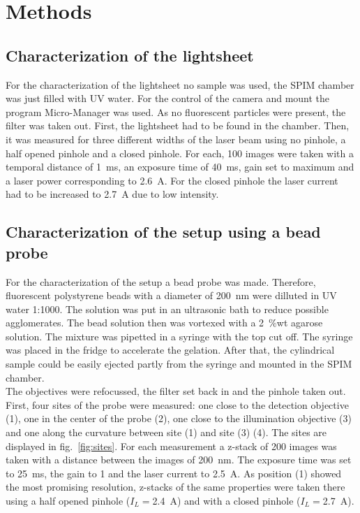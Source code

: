 \section{Methods}\label{sec:methods}
\subsection*{Characterization of the lightsheet}

For the characterization of the lightsheet no sample was used, the SPIM chamber was just filled with UV water. For the control of the camera and mount the program Micro-Manager was used. As no fluorescent particles were present, the filter was taken out. First, the lightsheet had to be found in the chamber. Then, it was measured for three different widths of the laser beam using no pinhole, a half opened pinhole and a closed pinhole. For each, 100 images were taken with a temporal distance of \SI{1}{\milli\second}, an exposure time of \SI{40}{\milli\second}, gain set to maximum and a laser power corresponding to \SI{2.6}{\ampere}. For the closed pinhole the laser current had to be increased to \SI{2.7}{\ampere} due to low intensity. 

\subsection*{Characterization of the setup using a bead probe}
For the characterization of the setup a bead probe was made. Therefore, fluorescent polystyrene beads with a diameter of \SI{200}{\nano\meter} were dilluted in UV water 1:1000. The solution was put in an ultrasonic bath to reduce possible agglomerates. The bead solution then was vortexed with a \SI{2}{\percent}wt agarose solution. The mixture was pipetted in a syringe with the top cut off. The syringe was placed in the fridge to accelerate the gelation. After that, the cylindrical sample could be easily ejected partly from the syringe and mounted in the SPIM chamber.\\
The objectives were refocussed, the filter set back in and the pinhole taken out. First, four sites of the probe were measured: one close to the detection objective (1), one in the center of the probe (2), one close to the illumination objective (3) and one along the curvature between site (1) and site (3) (4). The sites are displayed in fig.~\ref{fig:sites}. For each measurement a z-stack of 200 images was taken with a distance between the images of \SI{200}{\nano\meter}. The exposure time was set to \SI{25}{\milli\second}, the gain to \num{1} and the laser current to \SI{2.5}{\ampere}. As position (1) showed the most promising resolution, z-stacks of the same properties were taken there using a half opened pinhole ($I_L=$\SI{2.4}{\ampere}) and with a closed pinhole ($I_L=$\SI{2.7}{\ampere}).

